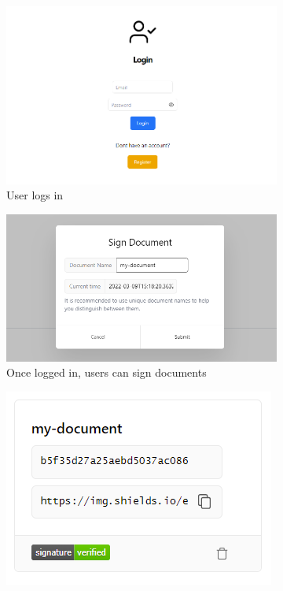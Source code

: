 \documentclass[a4,12pt]{article}
\begin{document}
\begin{figure}[htb]
    \centering
    \begin{subfigure}[b]{0.3\textwidth}
        \centering
        \includegraphics[width=\textwidth]{public/login.png}
        \caption{User logs in}
    \end{subfigure}
    \hfill
    \begin{subfigure}[b]{0.3\textwidth}
        \centering
        \includegraphics[width=\textwidth]{public/sign_form.png}
        \caption{Once logged in, users can sign documents}
    \end{subfigure}
    \hfill
    \begin{subfigure}[b]{0.3\textwidth}
        \centering
        \includegraphics[width=\textwidth]{public/doc_card.png}

\end{subfigure}
\end{figure}
\end{document}
